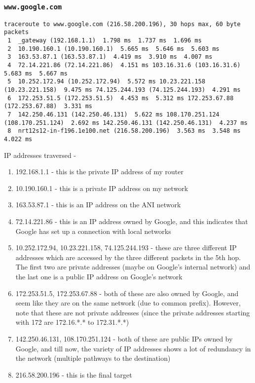 \documentclass[a4paper]{article}
\begin{document}
\subsubsection{\texttt{www.google.com}}

\begin{lstlisting}
traceroute to www.google.com (216.58.200.196), 30 hops max, 60 byte packets
 1  _gateway (192.168.1.1)  1.798 ms  1.737 ms  1.696 ms
 2  10.190.160.1 (10.190.160.1)  5.665 ms  5.646 ms  5.603 ms
 3  163.53.87.1 (163.53.87.1)  4.419 ms  3.910 ms  4.007 ms
 4  72.14.221.86 (72.14.221.86)  4.151 ms 103.16.31.6 (103.16.31.6)  5.683 ms  5.667 ms
 5  10.252.172.94 (10.252.172.94)  5.572 ms 10.23.221.158 (10.23.221.158)  9.475 ms 74.125.244.193 (74.125.244.193)  4.291 ms
 6  172.253.51.5 (172.253.51.5)  4.453 ms  5.312 ms 172.253.67.88 (172.253.67.88)  3.331 ms
 7  142.250.46.131 (142.250.46.131)  5.622 ms 108.170.251.124 (108.170.251.124)  2.692 ms 142.250.46.131 (142.250.46.131)  4.237 ms
 8  nrt12s12-in-f196.1e100.net (216.58.200.196)  3.563 ms  3.548 ms  4.022 ms
\end{lstlisting}

IP addresses traversed - 
\begin{enumerate}
\item 192.168.1.1 - this is the private IP address of my router
\item 10.190.160.1 - this is a private IP address on my network
\item 163.53.87.1 - this is an IP address on the ANI network
\item 72.14.221.86 - this is an IP address owned by Google, and this indicates that Google has set up a connection with local networks
\item 10.252.172.94, 10.23.221.158, 74.125.244.193 - these are three different IP addresses which are accessed by the three different packets in the 5th hop. The first two are private addresses (maybe on Google's internal network) and the last one is a public IP address on Google's network
\item 172.253.51.5, 172.253.67.88 - both of these are also owned by Google, and seem like they are on the same network (due to common prefix). However, note that these are not private addresses (since the private addresses starting with 172 are 172.16.*.* to 172.31.*.*)
\item 142.250.46.131, 108.170.251.124 - both of these are public IPs owned by Google, and till now, the variety of IP addresses shows a lot of redundancy in the network (multiple pathways to the destination)
\item 216.58.200.196 - this is the final target 
\end{enumerate}
\end{document}
